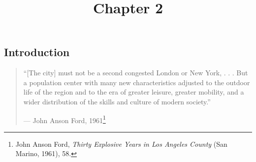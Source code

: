 \documentclass[11pt,article,oneside]{memoir}
\title{\bigskip \bigskip Chapter 2}
\author{\bigskip\Large }
\begin{document}
  

\setsansfont[Mapping=tex-text, BoldFont={* Bold SemiCondensed}, ItalicFont={* Semibold SemiCondensed Italic}]{Myriad Pro}
\setmonofont[Mapping=tex-text,Scale=MatchLowercase]{Consolas}


\setsansfont[Mapping=tex-text]{Minion Pro} 
\setmonofont[Mapping=tex-text,Scale=0.8]{Consolas}
\pagestyle{kjh}


\maketitle


\subsection{Introduction}

\begin{quote}
``{[}The city{]} must not be a second congested London or New York, . .
. But a population center with many new characteristics adjusted to the
outdoor life of the region and to the era of greater leisure, greater
mobility, and a wider distribution of the skills and culture of modern
society.''

--- John Anson Ford, 1961\footnote{John Anson Ford, \emph{Thirty
  Explosive Years in Los Angeles County} (San Marino, 1961), 58.}
\end{quote}
\end{document}
